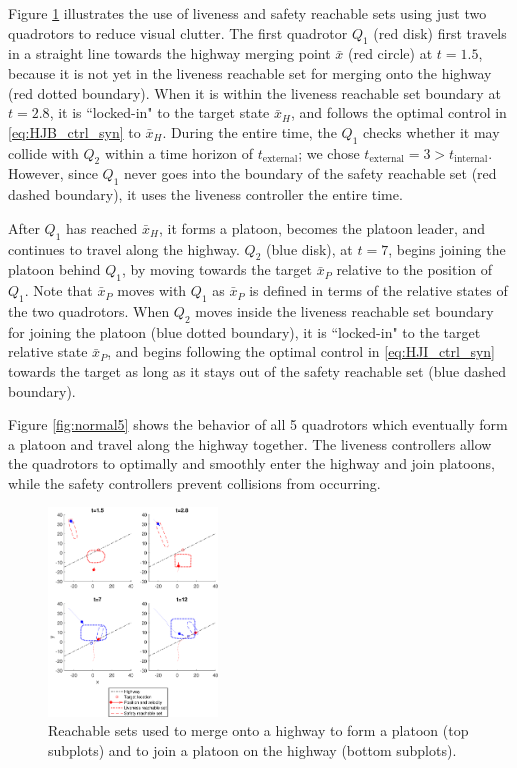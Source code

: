Figure \ref{fig:normal2} illustrates the use of liveness and safety reachable sets using just two quadrotors to reduce visual clutter. The first quadrotor $Q_1$ (red disk) first travels in a straight line towards the highway merging point $\bar{x}$ (red circle) at $t=1.5$, because it is not yet in the liveness reachable set for merging onto the highway (red dotted boundary). When it is within the liveness reachable set boundary at $t=2.8$, it is ``locked-in" to the target state $\bar{x}_H$, and follows the optimal control in \eqref{eq:HJB_ctrl_syn} to $\bar{x}_H$. During the entire time, the $Q_1$ checks whether it may collide with $Q_2$ within a time horizon of $t_\text{external}$; we chose $t_\text{external}=3>t_\text{internal}$. However, since $Q_1$ never goes into the boundary of the safety reachable set (red dashed boundary), it uses the liveness controller the entire time.

After $Q_1$ has reached $\bar{x}_H$, it forms a platoon, becomes the platoon leader, and continues to travel along the highway. $Q_2$ (blue disk), at $t=7$, begins joining the platoon behind $Q_1$, by moving towards the target $\bar{x}_P$ relative to the position of $Q_1$. Note that $\bar{x}_P$ moves with $Q_1$ as $\bar{x}_P$ is defined in terms of the relative states of the two quadrotors. When $Q_2$ moves inside the liveness reachable set boundary for joining the platoon (blue dotted boundary), it is ``locked-in" to the target relative state $\bar{x}_P$, and begins following the optimal control in \eqref{eq:HJI_ctrl_syn} towards the target as long as it stays out of the safety reachable set (blue dashed boundary).

Figure \ref{fig:normal5} shows the behavior of all 5 quadrotors which eventually form a platoon and travel along the highway together. The liveness controllers allow the quadrotors to optimally and smoothly enter the highway and join platoons, while the safety controllers prevent collisions from occurring.

\begin{figure}
	\centering
	\includegraphics[width=0.4\textwidth]{"fig/normal2"}
	\caption{Reachable sets used to merge onto a highway to form a platoon (top subplots) and to join a platoon on the highway (bottom subplots).}
	\label{fig:normal2}
\end{figure}

